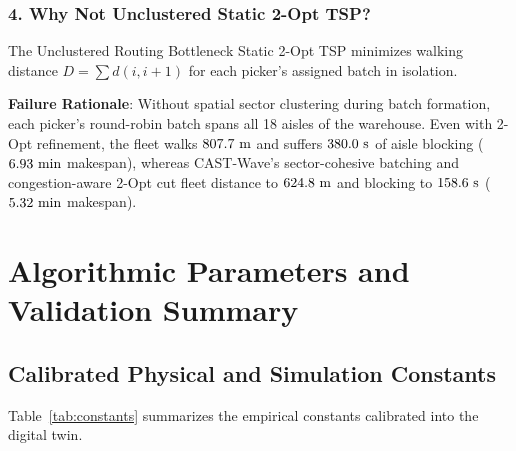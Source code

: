 \documentclass[11pt,a4paper]{article}
\begin{document}
\subsubsection{4. Why Not Unclustered Static 2-Opt TSP?}
\begin{rationalebox}{The Unclustered Routing Bottleneck}
Static 2-Opt TSP minimizes walking distance $D = \sum d(i, i+1)$ for each picker's assigned batch in isolation.
\end{rationalebox}
\textbf{Failure Rationale}: Without spatial sector clustering during batch formation, each picker's round-robin batch spans all 18 aisles of the warehouse. Even with 2-Opt refinement, the fleet walks $807.7\text{ m}$ and suffers $380.0\text{ s}$ of aisle blocking ($6.93\text{ min}$ makespan), whereas CAST-Wave's sector-cohesive batching and congestion-aware 2-Opt cut fleet distance to $624.8\text{ m}$ and blocking to $158.6\text{ s}$ ($5.32\text{ min}$ makespan).

\section{Algorithmic Parameters and Validation Summary}

\subsection{Calibrated Physical and Simulation Constants}
Table~\ref{tab:constants} summarizes the empirical constants calibrated into the digital twin.
\end{document}
